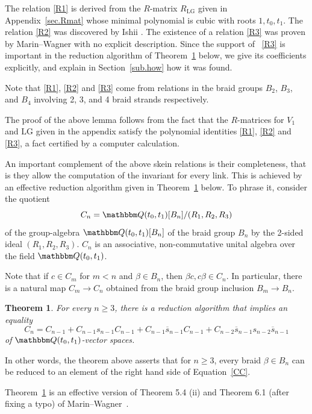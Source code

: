\documentclass[12pt,reqno]{amsart}
\newtheorem{theorem}{Theorem}[section]
\theoremstyle{definition}
\def\BQ{\mathbbm Q}
\def\be{\begin{equation}}
\def\ee{\end{equation}}
\def\hs{\overline{s}}
\def\LG{\mathrm{LG}}
\begin{document}
The relation \eqref{R1} is derived from the $R$-matrix $R_{\LG}$
given in Appendix~\ref{sec.Rmat} whose minimal polynomial is cubic with
roots $1,t_0,t_1$. The relation \eqref{R2} was discovered by Ishii \cite{Ish2}.
The existence of a relation \eqref{R3} was proven by Marin--Wagner 
\cite[Sec.6.2, Sec.6.3]{MW} with no explicit description. Since the support of
~\eqref{R3} is important in the reduction algorithm of Theorem~\ref{thm.2}
below, we give its coefficients explicitly, and explain in Section~\eqref{sub.how}
how it was found.

Note that \eqref{R1}, \eqref{R2}
and \eqref{R3} come from relations in the braid groups $B_2$,
$B_3$, and $B_4$ involving 2, 3, and 4 braid strands respectively. 

The proof of the above lemma follows from the fact that the $R$-matrices
for $V_1$ and $\LG$ given in the appendix satisfy the polynomial identities
\eqref{R1}, \eqref{R2} and \eqref{R3}, a fact certified by a computer calculation. 

An important complement of the above skein relations is their completeness, that is
they allow the computation of the invariant for every link. This is achieved
by an effective reduction algorithm given in Theorem~\ref{thm.2} below.
To phrase it, consider the quotient 
\be
\label{Cndef}
C_n=\BQ(t_0,t_1)[B_{n}]/(R_1,R_2,R_3)
\ee
of the group-algebra $\BQ(t_0,t_1)[B_n]$ of the braid group $B_n$ by the
2-sided ideal $(R_1,R_2,R_3)$. $C_n$ is an associative, non-commutative unital
algebra over the field $\BQ(t_0,t_1)$.

Note that if $c \in C_m$ for $m <n$ and $\beta \in B_n$, then
$\beta c, c \beta \in C_n$. In particular, there is a natural map $C_m \to C_n$
obtained from the braid group inclusion $B_m \to B_n$. 

\begin{theorem}
\label{thm.2}
For every $n \geq 3$, there is a reduction algorithm that implies
an equality 
\be
\label{CC}
C_n = C_{n-1} + C_{n-1} s_{n-1} C_{n-1} + C_{n-1} \hs_{n-1} C_{n-1} +
C_{n-2} \hs_{n-1} s_{n-2} \hs_{n-1} 
\ee
of $\BQ(t_0,t_1)$-vector spaces. 
\end{theorem}

In other words, the theorem above asserts that for $n \geq 3$, every braid
$\beta \in B_n$ can be reduced to an element of the right hand side of
Equation~\eqref{CC}.

Theorem~\ref{thm.2} is an effective version of Theorem 5.4 (ii) and Theorem 6.1
(after fixing a typo) of Marin--Wagner~\cite{MW}.
\end{document}
